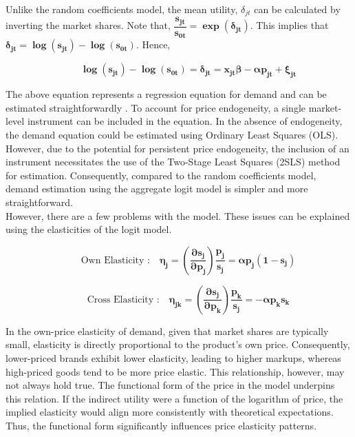 \documentclass[a4paper,11pt]{article}
\begin{document}
    Unlike the random coefficients model, the mean utility, $\delta_{jt}$ can be calculated by inverting the market shares. Note that, $\mathbf{\dfrac{s_{jt}}{s_{0t}} = \exp(\delta_{jt})}$. This implies that $\mathbf{\delta_{jt} = \log(s_{jt}) - \log(s_{0t})}$. Hence, 
    
    \begin{equation*}
        \qquad \mathbf{\log(s_{jt}) - \log(s_{0t}) = \delta_{jt} = x_{jt}\beta - \alpha p_{jt} + \xi_{jt}}
    \end{equation*}

    The above equation represents a regression equation for demand and can be estimated straightforwardly \cite{BerryandHaile}. To account for price endogeneity, a single market-level instrument can be included in the equation. In the absence of endogeneity, the demand equation could be estimated using Ordinary Least Squares (OLS). However, due to the potential for persistent price endogeneity, the inclusion of an instrument necessitates the use of the Two-Stage Least Squares (2SLS) method for estimation. Consequently, compared to the random coefficients model, demand estimation using the aggregate logit model is simpler and more straightforward.\\
    
    However, there are a few problems with the model. These issues can be explained using the elasticities of the logit model.

    \begin{equation*}
        \qquad \text{Own Elasticity :} \quad \mathbf{\eta_{j} = \left(\dfrac{\partial s_{j}}{\partial p_{j}}\right) \dfrac{p_{j}}{s_{j}} = \alpha p_{j}\left(1 - s_{j}\right) }
    \end{equation*}

    \begin{equation*}
        \qquad \text{Cross Elasticity :} \quad \mathbf{\eta_{jk} = \left(\dfrac{\partial s_{j}}{\partial p_{k}}\right) \dfrac{p_{k}}{s_{j}} = -\alpha p_{k}s_{k} }
    \end{equation*}

    In the own-price elasticity of demand, given that market shares are typically small, elasticity is directly proportional to the product's own price. Consequently, lower-priced brands exhibit lower elasticity, leading to higher markups, whereas high-priced goods tend to be more price elastic. This relationship, however, may not always hold true. The functional form of the price in the model underpins this relation. If the indirect utility were a function of the logarithm of price, the implied elasticity would align more consistently with theoretical expectations. Thus, the functional form significantly influences price elasticity patterns.\\
\end{document}
